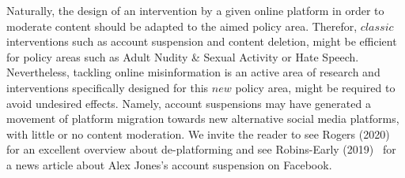 \documentclass{article}
\begin{document}
Naturally, the design of an intervention by a given online platform in order to moderate content should be adapted to the aimed policy area. Therefor, $classic$ interventions such as account suspension and content deletion, might be efficient for policy areas such as Adult Nudity \& Sexual Activity or Hate Speech. Nevertheless, tackling online misinformation is an active area of research and interventions specifically designed for this $new$ policy area, might be required to avoid undesired effects. Namely, account suspensions may have generated a movement of platform migration towards new alternative social media platforms, with little or no content moderation. We invite the reader to see Rogers (2020)~\cite{rogers2020} for an excellent overview about de-platforming and see Robins-Early (2019)~\cite{huffpost} for a news article about Alex Jones's account suspension on Facebook.

\smallskip

\end{document}

